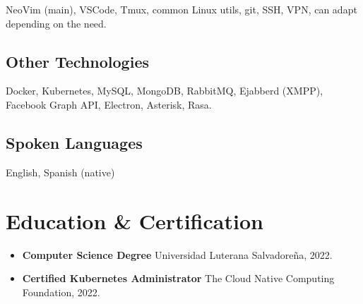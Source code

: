\documentclass[letterpaper]{article}
\begin{document}
NeoVim (main), VSCode, Tmux, common Linux utils, git, SSH, VPN, can adapt depending on the need.

\subsection{Other Technologies}

Docker, Kubernetes, MySQL, MongoDB, RabbitMQ, Ejabberd (XMPP), Facebook Graph API, Electron, Asterisk, Rasa.

\subsection{Spoken Languages}

English, Spanish (native)

\section{Education \& Certification}

\begin{itemize}
	\item \textbf{Computer Science Degree} \newline Universidad Luterana Salvadoreña, 2022.

	\item \textbf{Certified Kubernetes Administrator} \newline The Cloud Native Computing Foundation, 2022.
\end{itemize}
\end{document}
